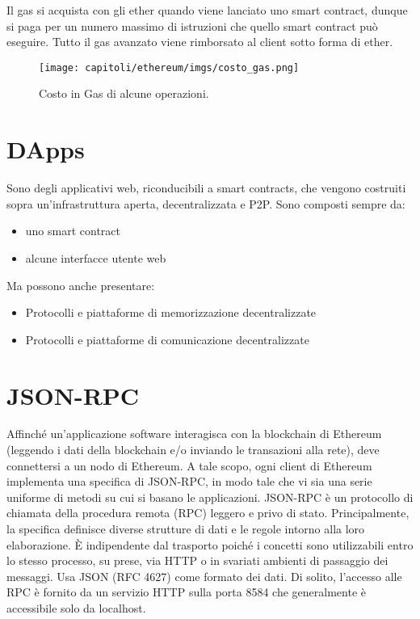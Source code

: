 Il gas si acquista con gli ether quando viene lanciato uno smart contract,
dunque si paga per un numero massimo di istruzioni che quello smart contract può eseguire.
Tutto il gas avanzato viene rimborsato al client sotto forma di ether.

\begin{figure}[H]
      \centering
      \texttt{[image: capitoli/ethereum/imgs/costo\_gas.png]}
      \caption{Costo in Gas di alcune operazioni.}
\end{figure}

\section{DApps}

Sono degli applicativi web, riconducibili a smart contracts, che vengono costruiti sopra
un'infrastruttura aperta, decentralizzata e P2P.
Sono composti sempre da:

\begin{itemize}
      \item uno smart contract
      \item alcune interfacce utente web
\end{itemize}

Ma possono anche presentare:

\begin{itemize}
      \item Protocolli e piattaforme di memorizzazione decentralizzate
      \item Protocolli e piattaforme di comunicazione decentralizzate
\end{itemize}

\section{JSON-RPC}

Affinché un'applicazione software interagisca con la blockchain di Ethereum
(leggendo i dati della blockchain e/o inviando le transazioni alla rete), deve connettersi a
un nodo di Ethereum.
A tale scopo, ogni client di Ethereum implementa una specifica di JSON-RPC, in modo tale che vi
sia una serie uniforme di metodi su cui si basano le applicazioni.
JSON-RPC è un protocollo di chiamata della procedura remota (RPC) leggero e privo di stato.
Principalmente, la specifica definisce diverse strutture di dati e le regole intorno alla loro
elaborazione. È indipendente dal trasporto poiché i concetti sono utilizzabili entro lo stesso
processo, su prese, via HTTP o in svariati ambienti di passaggio dei messaggi. Usa JSON (RFC 4627)
come formato dei dati.
Di solito, l'accesso alle RPC è fornito da un servizio HTTP sulla porta 8584 che
generalmente è accessibile solo da localhost.

